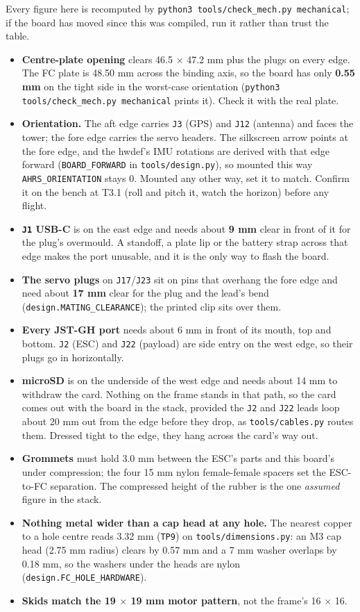 \documentclass[11pt,a4paper]{article}
\newcommand{\file}[1]{\texttt{\small #1}}
\newcommand{\cmd}[1]{\texttt{\small #1}}
\newcommand{\flag}[1]{\textcolor{warnred}{\textbf{#1}}}
\begin{document}
Every figure here is recomputed by \cmd{python3 tools/check\_mech.py mechanical}; if the board
has moved since this was compiled, run it rather than trust the table.

\begin{itemize}
\item \textbf{Centre-plate opening} clears 46.5 $\times$ 47.2 mm plus the plugs on every
edge. The FC plate is 48.50 mm across the binding axis, so the board has only
\flag{0.55 mm} on the tight side in the worst-case orientation (\cmd{python3 tools/check\_mech.py
mechanical} prints it). Check it with the real plate.
\item \flag{Orientation.} The aft edge carries \file{J3} (GPS) and \file{J12} (antenna) and
faces the tower; the fore edge carries the servo headers. The silkscreen arrow points at the
fore edge, and the hwdef's IMU rotations are derived with that edge forward
(\file{BOARD\_FORWARD} in \file{tools/design.py}), so mounted this way \file{AHRS\_ORIENTATION}
stays 0. Mounted any other way, set it to match.
Confirm it on the bench at T3.1 (roll and pitch it, watch the horizon) before any flight.
\item \textbf{\file{J1} USB-C} is on the east edge and needs about \textbf{9 mm} clear in
front of it for the plug's overmould. A standoff, a plate lip or the battery strap across
that edge makes the port unusable, and it is the only way to flash the board.
\item \textbf{The servo plugs} on \file{J17}/\file{J23} sit on pins that overhang the fore
edge and need about \textbf{17 mm} clear for the plug and the lead's bend
(\file{design.MATING\_CLEARANCE}); the printed clip sits over them.
\item \textbf{Every JST-GH port} needs about 6 mm in front of its mouth, top and bottom.
\file{J2} (ESC) and \file{J22} (payload) are side entry on the west edge, so their plugs go
in horizontally.
\item \textbf{microSD} is on the underside of the west edge and needs about 14 mm to withdraw
the card. Nothing on the frame stands in that path, so the card comes out with the board in
the stack, provided the \file{J2} and \file{J22} leads loop about 20 mm out from the edge
before they drop, as \file{tools/cables.py} routes them. Dressed tight to the edge, they hang
across the card's way out.
\item \textbf{Grommets} must hold 3.0 mm between the ESC's parts and this board's under
compression; the four 15 mm nylon female-female spacers set the ESC-to-FC separation. The
compressed height of the rubber is the one \emph{assumed} figure in the stack.
\item \textbf{Nothing metal wider than a cap head at any hole.} The nearest copper to a hole
centre reads 3.32 mm (\file{TP9}) on \file{tools/dimensions.py}: an M3 cap head (2.75 mm
radius) clears by 0.57 mm and a 7 mm washer overlaps by 0.18 mm, so the washers under the
heads are nylon (\file{design.FC\_HOLE\_HARDWARE}).
\item \textbf{Skids match the 19 $\times$ 19 mm motor pattern}, not the frame's 16 $\times$ 16.
\end{itemize}
\end{document}
